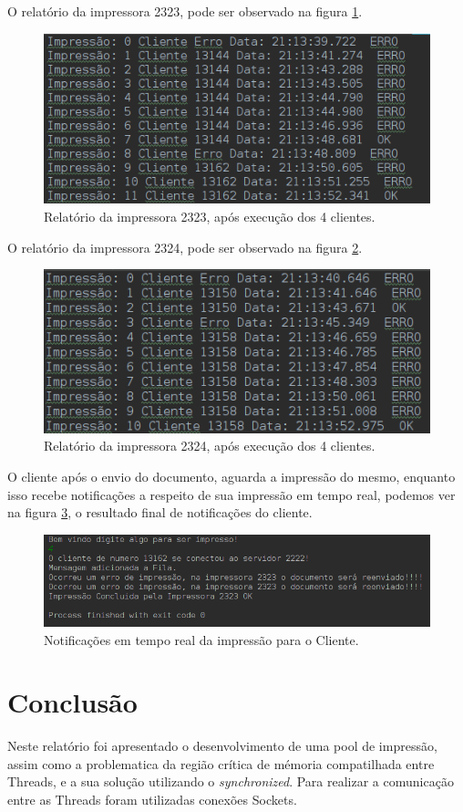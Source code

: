 \documentclass[12pt]{article}
\begin{document}
 
 O relatório da impressora 2323, pode ser observado na figura \ref{fig:screenshot010}.

 \begin{figure}[H]
 	\centering
 	\includegraphics[width=0.7\linewidth]{imagens/screenshot013}
 	\caption{Relatório da impressora 2323, após execução dos 4 clientes.}
 	\label{fig:screenshot010}
 \end{figure}
 
  O relatório da impressora 2324, pode ser observado na figura \ref{fig:screenshot012}.
  \begin{figure}[H]
  	\centering
  	\includegraphics[width=0.7\linewidth]{imagens/screenshot012}
  	\caption{Relatório da impressora 2324, após execução dos 4 clientes.}
  	\label{fig:screenshot012}
  \end{figure}
  
  O cliente após  o envio do documento, aguarda a impressão do mesmo, enquanto isso recebe notificações  a respeito de sua impressão em tempo real, podemos ver  na figura  \ref{fig:screenshot015}, o resultado final de notificações do cliente.
  
  \begin{figure}[H]
  	\centering
  	\includegraphics[width=0.7\linewidth]{imagens/screenshot015}
  	\caption{Notificações em tempo real da impressão para o Cliente.}
  	\label{fig:screenshot015}
  \end{figure}
  
\section{Conclusão}
Neste relatório foi apresentado  o desenvolvimento de uma pool de impressão, assim como a problematica da região crítica de mémoria compatilhada entre Threads, e a sua solução utilizando  o \textit{synchronized}.
Para realizar a comunicação entre as Threads foram utilizadas conexões Sockets.



\end{document}
